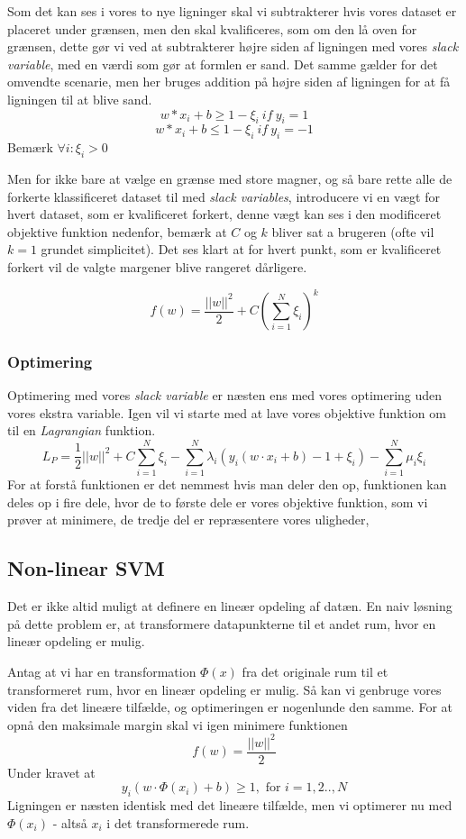 \documentclass{article}
\begin{document}
 Som det kan ses i vores to nye ligninger skal vi subtrakterer hvis vores dataset er placeret under grænsen, men den skal kvalificeres, som om den lå oven for grænsen, dette gør vi ved at subtrakterer højre siden af ligningen med vores \textit{slack variable}, med en værdi som gør at formlen er sand. Det samme gælder for det omvendte scenarie, men her bruges addition på højre siden af ligningen for at få ligningen til at blive sand.  
$$w * x_i + b \geq 1 - \xi_i \ if \ y_i = 1$$
$$w * x_i + b \leq 1 - \xi_i \ if \ y_i = -1$$
Bemærk $\forall i : \xi_i > 0$

Men for ikke bare at vælge en grænse med store magner, og så bare rette alle de forkerte klassificeret dataset til med \textit{slack variables}, introducere vi en vægt for hvert dataset, som er kvalificeret forkert, denne vægt kan ses i den modificeret objektive funktion nedenfor, bemærk at $C$ og $k$ bliver sat a brugeren (ofte vil $k = 1$ grundet simplicitet). Det ses klart at for hvert punkt, som er kvalificeret forkert vil de valgte margener blive rangeret dårligere. 

$$f(w) = \frac{||w||^2}{2}+C(\sum\limits_{i=1}^N \xi_i)^k$$

\subsubsection{Optimering}
Optimering med vores \textit{slack variable} er næsten ens med vores optimering uden vores ekstra variable. Igen vil vi starte med at lave vores objektive funktion om til en \textit{Lagrangian} funktion.
$$L_P = \frac{1}{2}||w||^2 + C \sum\limits_{i=1}^N \xi_i - \sum\limits_{i=1}^N \lambda_i (y_i(w \cdot x_i + b) - 1 + \xi_i) - \sum\limits_{i=1}^N \mu_i \xi_i$$
For at forstå funktionen er det nemmest hvis man deler den op, funktionen kan deles op i fire dele, hvor de to første dele er vores objektive funktion, som vi prøver at minimere, de tredje del  er repræsentere vores uligheder, 

\subsection{Non-linear SVM}
Det er ikke altid muligt at definere en lineær opdeling af datæn. En naiv løsning på dette problem er, at transformere datapunkterne til et andet rum, hvor en lineær opdeling er mulig.

Antag at vi har en transformation $\Phi(x)$ fra det originale rum til et transformeret rum, hvor en lineær opdeling er mulig. Så kan vi genbruge vores viden fra det lineære tilfælde, og optimeringen er nogenlunde den samme. For at opnå den maksimale margin skal vi igen minimere funktionen 
$$f(w)=\frac{||w||^2}{2}$$
Under kravet at
$$y_i(w\cdot\Phi(x_i)+b)\geq 1,\text{ for }i=1,2..,N$$
Ligningen er næsten identisk med det lineære tilfælde, men vi optimerer nu med $\Phi(x_i)$ - altså $x_i$ i det transformerede rum.
\end{document}
